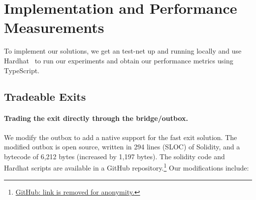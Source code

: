 \section{Implementation and Performance Measurements} 
To implement our solutions, we get an \arb \nitro test-net up and running locally and use Hardhat~\cite{hardhatonline} to run our experiments and obtain our performance metrics using TypeScript. 


\subsection{Tradeable Exits}

\paragraph{Trading the exit directly through the bridge/outbox.} We modify the \arb \nitro outbox to add a native support for the fast exit solution. The modified outbox is open source, written in 294 lines (SLOC) of Solidity, and a bytecode of 6,212 bytes (increased by 1,197 bytes). The solidity code and Hardhat scripts are available in a GitHub repository.\footnote{\href{https://}{GitHub: link is removed for anonymity.}} Our modifications include:

